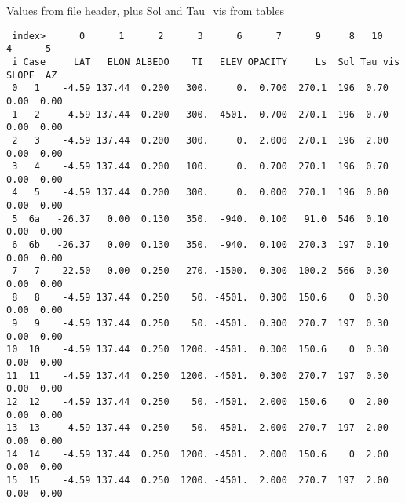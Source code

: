 \documentclass{article}
\begin{document}
\begin{table} \caption[AV models]{Values from file header, plus Sol and Tau_vis from tables}  \label{AshM} 
\begin{verbatim}
 index>      0      1      2      3      6      7      9     8   10     4      5
 i Case     LAT   ELON ALBEDO    TI   ELEV OPACITY     Ls  Sol Tau_vis SLOPE  AZ
 0   1    -4.59 137.44  0.200   300.     0.  0.700  270.1  196  0.70  0.00  0.00
 1   2    -4.59 137.44  0.200   300. -4501.  0.700  270.1  196  0.70  0.00  0.00
 2   3    -4.59 137.44  0.200   300.     0.  2.000  270.1  196  2.00  0.00  0.00
 3   4    -4.59 137.44  0.200   100.     0.  0.700  270.1  196  0.70  0.00  0.00
 4   5    -4.59 137.44  0.200   300.     0.  0.000  270.1  196  0.00  0.00  0.00
 5  6a   -26.37   0.00  0.130   350.  -940.  0.100   91.0  546  0.10  0.00  0.00
 6  6b   -26.37   0.00  0.130   350.  -940.  0.100  270.3  197  0.10  0.00  0.00
 7   7    22.50   0.00  0.250   270. -1500.  0.300  100.2  566  0.30  0.00  0.00
 8   8    -4.59 137.44  0.250    50. -4501.  0.300  150.6    0  0.30  0.00  0.00
 9   9    -4.59 137.44  0.250    50. -4501.  0.300  270.7  197  0.30  0.00  0.00
10  10    -4.59 137.44  0.250  1200. -4501.  0.300  150.6    0  0.30  0.00  0.00
11  11    -4.59 137.44  0.250  1200. -4501.  0.300  270.7  197  0.30  0.00  0.00
12  12    -4.59 137.44  0.250    50. -4501.  2.000  150.6    0  2.00  0.00  0.00
13  13    -4.59 137.44  0.250    50. -4501.  2.000  270.7  197  2.00  0.00  0.00
14  14    -4.59 137.44  0.250  1200. -4501.  2.000  150.6    0  2.00  0.00  0.00
15  15    -4.59 137.44  0.250  1200. -4501.  2.000  270.7  197  2.00  0.00  0.00


\end{verbatim}
\end{table}
\end{document}
